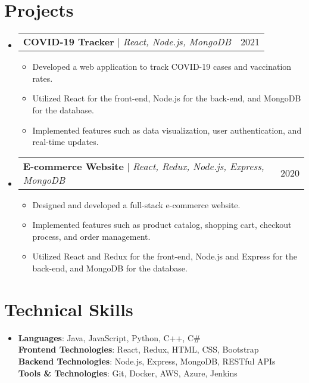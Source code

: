 \documentclass[letterpaper,11pt]{article}
\makeatletter
\newcommand{\resumeItem}[1]{
\item\small{
{#1 \vspace{-2pt}}
}
}
\newcommand{\resumeProjectHeading}[2]{
\item
\begin{tabular*}{0.97\textwidth}{l@{\extracolsep{\fill}}r}
\small#1 & #2 \\
\end{tabular*}\vspace{-7pt}
}
\newcommand{\resumeSubHeadingListStart}{\begin{itemize}[leftmargin=0.15in, label={}]}
\newcommand{\resumeSubHeadingListEnd}{\end{itemize}}
\newcommand{\resumeItemListStart}{\begin{itemize}}
\newcommand{\resumeItemListEnd}{\end{itemize}\vspace{-5pt}}
\makeatother
\begin{document}
\section{Projects}
\resumeSubHeadingListStart
\resumeProjectHeading{\textbf{COVID-19 Tracker} $|$ \emph{React, Node.js, MongoDB}}{2021}
\resumeItemListStart
\resumeItem{Developed a web application to track COVID-19 cases and vaccination rates.}
\resumeItem{Utilized React for the front-end, Node.js for the back-end, and MongoDB for the database.}
\resumeItem{Implemented features such as data visualization, user authentication, and real-time updates.}
\resumeItemListEnd

\resumeProjectHeading{\textbf{E-commerce Website} $|$ \emph{React, Redux, Node.js, Express, MongoDB}}{2020}
\resumeItemListStart
\resumeItem{Designed and developed a full-stack e-commerce website.}
\resumeItem{Implemented features such as product catalog, shopping cart, checkout process, and order management.}
\resumeItem{Utilized React and Redux for the front-end, Node.js and Express for the back-end, and MongoDB for the database.}
\resumeItemListEnd
\resumeSubHeadingListEnd

\section{Technical Skills} %
\begin{itemize}[leftmargin=0.15in, label={}]
\item{
\textbf{Languages}{: Java, JavaScript, Python, C++, C\#} \\
\textbf{Frontend Technologies}{: React, Redux, HTML, CSS, Bootstrap} \\
\textbf{Backend Technologies}{: Node.js, Express, MongoDB, RESTful APIs} \\
\textbf{Tools & Technologies}{: Git, Docker, AWS, Azure, Jenkins}
} \\
\end{itemize}


\end{document}
